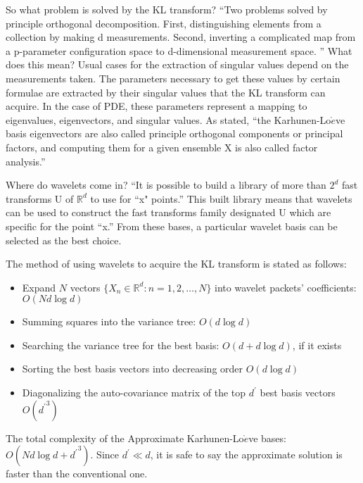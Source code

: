 So what problem is solved by the KL transform?   ``Two problems solved by  principle orthogonal decomposition.  First, distinguishing elements from a collection by making d measurements.  Second, inverting a complicated map from a p-parameter configuration space to d-dimensional measurement space. '' \cite{victor}  What does this mean?  Usual cases for the extraction of singular values depend on the measurements taken.  The parameters necessary to get these values by certain formulae are extracted by their singular values that the KL transform can acquire.  In the case of PDE, these parameters represent a mapping to eigenvalues, eigenvectors, and singular values.  As stated, ``the Karhunen-Lo$\grave{e}$ve basis eigenvectors are also called principle orthogonal components or principal factors, and computing them for a given ensemble X is also called factor analysis.''\cite{victor}

Where do wavelets come in?   ``It is possible to build a library of more than $2^d$ fast transforms U of ${\mathbb R}^d$ to use for ``x" points.''\cite{victor}
 This  built library means that wavelets can be used to construct the fast transforms family designated U which are specific for the point ``x.''  From these bases, a particular wavelet basis can be selected as the best choice. %


The method of using wavelets to acquire the KL transform is stated as follows:  
 \begin{itemize}
\item Expand $N$ vectors $\{X_n \in {\mathbb R}^d : n = 1,2, \ldots ,N\}$ into wavelet packets' coefficients: $O(Nd\log d)$
 \item Summing squares into the variance tree: $O(d \log d)$
 \item Searching the variance tree for the best basis: $O(d+d\log d)$, if it exists
 \item Sorting the best basis vectors into decreasing order $O(d \log d)$
 \item Diagonalizing the auto-covariance matrix of the top $d^\prime$ best basis vectors $O({d^\prime}^3)$
\end{itemize}

The total complexity of the Approximate Karhunen-Lo$\grave{e}$ve bases: $O(Nd\log d + {d^\prime}^3)$.  Since $d^\prime \ll d$, it is safe to say the approximate solution is faster than the conventional one. 

